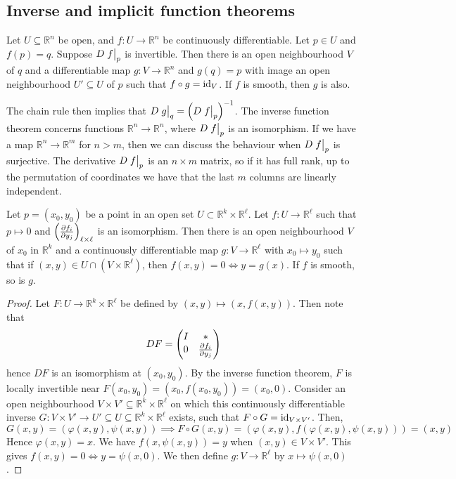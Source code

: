 \subsection{Inverse and implicit function theorems}
\begin{theorem}
	Let \( U \subseteq \mathbb R^n \) be open, and \( f \colon U \to \mathbb R^n \) be continuously differentiable.
	Let \( p \in U \) and \( f(p) = q \).
	Suppose \( D\eval{f}_p \) is invertible.
	Then there is an open neighbourhood \( V \) of \( q \) and a differentiable map \( g \colon V \to \mathbb R^n \) and \( g(q) = p \) with image an open neighbourhood \( U' \subseteq U \) of \( p \) such that \( f \circ g = \operatorname{id}_V \).
	If \( f \) is smooth, then \( g \) is also.
\end{theorem}
\begin{remark}
	The chain rule then implies that \( D\eval{g}_q = \qty(D\eval{f}_p)^{-1} \).
	The inverse function theorem concerns functions \( \mathbb R^n \to \mathbb R^n \), where \( D\eval{f}_p \) is an isomorphism.
	If we have a map \( \mathbb R^n \to \mathbb R^m \) for \( n > m \), then we can discuss the behaviour when \( D\eval{f}_p \) is surjective.
	The derivative \( D\eval{f}_p \) is an \( n \times m \) matrix, so if it has full rank, up to the permutation of coordinates we have that the last \( m \) columns are linearly independent.
\end{remark}
\begin{theorem}
	Let \( p = (x_0, y_0) \) be a point in an open set \( U \subset \mathbb R^k \times \mathbb R^\ell \).
	Let \( f \colon U \to \mathbb R^\ell \) such that \( p \mapsto 0 \) and \( \qty(\pdv{f_i}{y_j})_{\ell \times \ell} \) is an isomorphism.
	Then there is an open neighbourhood \( V \) of \( x_0 \) in \( \mathbb R^k \) and a continuously differentiable map \( g \colon V \to \mathbb R^\ell \) with \( x_0 \mapsto y_0 \) such that if \( (x,y) \in U \cap (V \times \mathbb R^\ell) \), then \( f(x,y)=0\iff y=g(x) \).
	If \( f \) is smooth, so is \( g \).
\end{theorem}
\begin{proof}
	Let \( F \colon U \to \mathbb R^k \times \mathbb R^\ell \) be defined by \( (x,y) \mapsto (x,f(x,y)) \).
	Then note that
	\[ DF = \begin{pmatrix}
		I & \ast \\
		0 & \pdv{f_i}{y_j}
	\end{pmatrix} \]
	hence \( DF \) is an isomorphism at \( (x_0, y_0) \).
	By the inverse function theorem, \( F \) is locally invertible near \( F(x_0,y_0) = (x_0,f(x_0,y_0)) = (x_0, 0) \).
	Consider an open neighbourhood \( V \times V' \subseteq \mathbb R^k \times \mathbb R^\ell \) on which this continuously differentiable inverse \( G \colon V \times V' \to U' \subseteq U \subseteq \mathbb R^k \times \mathbb R^\ell \) exists, such that \( F \circ G = \operatorname{id}_{V \times V'} \).
	Then,
	\[ G(x,y) = (\varphi(x,y), \psi(x,y)) \implies F \circ G(x,y) = (\varphi(x,y), f(\varphi(x,y), \psi(x,y))) = (x,y) \]
	Hence \( \varphi(x,y) = x \).
	We have \( f(x,\psi(x,y)) = y \) when \( (x,y) \in V \times V' \).
	This gives \( f(x,y) = 0 \iff y = \psi(x,0) \).
	We then define \( g \colon V \to \mathbb R^\ell \) by \( x \mapsto \psi(x,0) \).
\end{proof}
